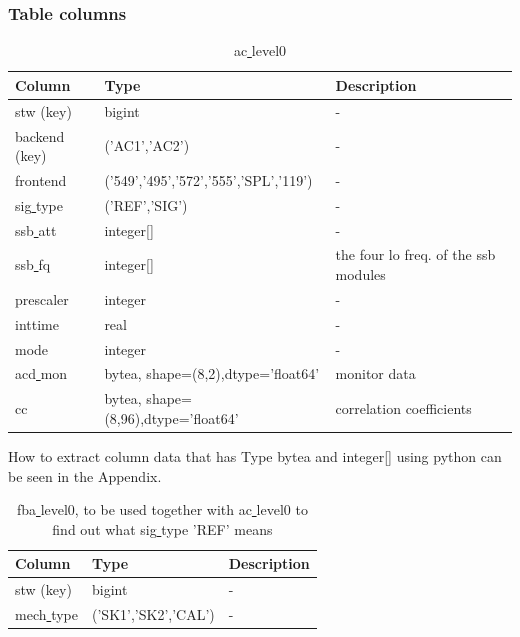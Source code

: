 \documentclass[12pt]{article}
\begin{document}
\clearpage
\newpage
\subsubsection*{Table columns}

\begin{table}[ht]
\caption{ac\underline{ }level0}
\centering
\begin{tabular}{l l l}
\hline\hline
Column & Type & Description \\ [0.5ex]
\hline
stw (key)            & bigint                                &  - \\
backend (key)        & ('AC1','AC2')                         & -\\
frontend             & ('549','495','572','555','SPL','119') & -\\
sig\underline{ }type & ('REF','SIG')                         & -\\
ssb\underline{ }att  & integer[]                             & -\\
ssb\underline{ }fq   & integer[]                             & the four lo freq. of the ssb modules\\
prescaler            & integer                               & -\\
inttime              & real                                  & -\\
mode                 & integer                               & -\\
acd\underline{ }mon  & bytea, shape=(8,2),dtype='float64'    & monitor data\\
cc                   & bytea, shape=(8,96),dtype='float64'   & correlation coefficients\\[1ex]
\hline
\end{tabular}
\label{table:ac0}
\end{table}
How to extract column data that has Type bytea and integer[] using
python can be seen in the Appendix.
\begin{table}[ht]
\caption{fba\underline{ }level0, to be used together with ac\underline{ }level0
to find out what sig\underline{ }type 'REF' means}
\centering
\begin{tabular}{l l l}
\hline\hline
Column & Type & Description \\ [0.5ex]
\hline
stw (key) & bigint & - \\
mech\underline{ }type & ('SK1','SK2','CAL') & -\\[1ex]
\hline
\end{tabular}
\label{table:fba0}
\end{table}
\end{document}

